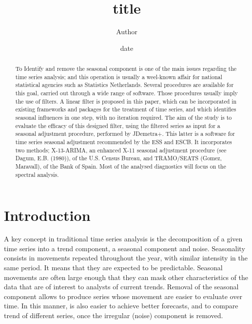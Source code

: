 \documentclass{article}
\title{title}
\author{Author}
\date{date}
\begin{document}
\maketitle
\bigskip
\begin{abstract}
To Identify and remove the seasonal component is one of the main issues regarding the time series analysis; and this operation is usually a weel-known affair for national statistical agencies such as Statistics Netherlands. Several procedures are available for this goal, carried out through a wide range of software. Those procedures usually imply the use of filters.  A linear filter is proposed in this paper, which can be incorporated in existing frameworks and packages for the treatment of time series, and which identifies seasonal influences in one step, with no iteration required. The aim of the study is to evaluate the efficacy of this designed filter, using the filtered series as input for a seasonal adjustment procedure, performed by JDemetra+. This latter is a software for time series seasonal adjustment recommended by the ESS and ESCB. It incorporates two methods; X-13-ARIMA, an enhanced X-11 seasonal adjustment procedure (see Dagum, E.B. (1980)), of the U.S. Census Bureau, and TRAMO/SEATS (Gomez, Maravall), of the Bank of Spain. Most of the analysed diagnostics will focus on the spectral analysis.
\end{abstract}
\bigskip
\section{Introduction}
A key concept in traditional time series analysis is the decomposition of a given time series into a trend component, a seasonal component and noise. Seasonality consists in movements repeated throughout the year, with similar intensity in the same period. It means that they are expected to be predictable. Seasonal movements are often large enough that they can mask other characteristics of the data that are of interest to analysts of current trends. Removal of the seasonal component allows to produce series whose movement are easier to evaluate over time. In this manner, is also easier to achieve better forecasts, and to compare trend of different series, once the irregular (noise) component is removed.\\
\end{document}
